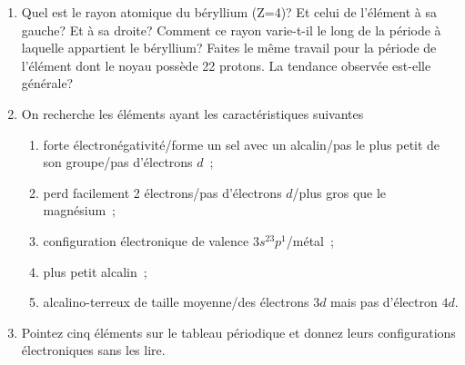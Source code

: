 \begin{enumerate}[\bf 1)]
\begin{enumerate}
des familles suivantes~: alcalins, alcalino-terreux, halog\`enes, gaz rares.
\item Le chlore est un halog\`ene de la troisi\`eme p\'eriode du tableau, quelle est sa configuration \'electronique de valence? M\^eme question pour le brome qui se trouve juste sous le chlore.
\item Le phosphore a la configuration \'electronique suivante $[Ne]3s^23p^3$. Quelle est la configuration
\'electronique de l'azote qui se trouve directement au-dessus du phosphore?
\end{enumerate}
\item Quel est le rayon atomique du b\'eryllium (Z=4)? Et celui de l'\'el\'ement \`a sa gauche? Et \`a sa droite?
Comment ce rayon varie-t-il le long de la p\'eriode \`a laquelle appartient le b\'eryllium?
Faites le m\^eme travail pour la p\'eriode de l'\'el\'ement dont le noyau poss\`ede 22 protons.
La tendance observ\'ee est-elle g\'en\'erale?
\item On recherche les \'el\'ements ayant les caract\'eristiques suivantes~
\begin{enumerate}
\item forte \'electron\'egativit\'e/forme un sel avec un alcalin/pas le plus petit de son 
groupe/pas d'\'electrons $d$~;
\item perd facilement 2 \'electrons/pas d'\'electrons $d$/plus gros que le magn\'esium~;
\item configuration \'electronique de valence $3s^23p^1$/m\'etal~;
\item plus petit alcalin~;
\item alcalino-terreux de taille moyenne/des \'electrons $3d$ mais pas d'\'electron $4d$.
\end{enumerate}
\item Pointez cinq \'el\'ements sur le tableau p\'eriodique et donnez leurs configurations 
\'electroniques sans les lire.
\end{enumerate}
%
